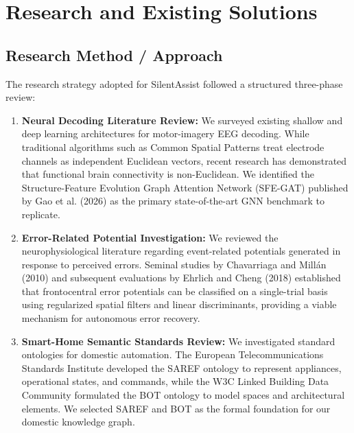 \documentclass[12pt,a4paper]{report}
\begin{document}
\chapter{Research and Existing Solutions}

\section{Research Method / Approach}
The research strategy adopted for SilentAssist followed a structured three-phase review:
\begin{enumerate}[leftmargin=1.5em]
    \item \textbf{Neural Decoding Literature Review:} We surveyed existing shallow and deep learning architectures for motor-imagery EEG decoding. While traditional algorithms such as Common Spatial Patterns treat electrode channels as independent Euclidean vectors, recent research has demonstrated that functional brain connectivity is non-Euclidean. We identified the Structure-Feature Evolution Graph Attention Network (SFE-GAT) published by Gao et al. (2026) \cite{gao2026sfegat} as the primary state-of-the-art GNN benchmark to replicate.
    \item \textbf{Error-Related Potential Investigation:} We reviewed the neurophysiological literature regarding event-related potentials generated in response to perceived errors. Seminal studies by Chavarriaga and Mill\'{a}n (2010) \cite{chavarriaga2010errp} and subsequent evaluations by Ehrlich and Cheng (2018) \cite{ehrlich2018errp} established that frontocentral error potentials can be classified on a single-trial basis using regularized spatial filters and linear discriminants, providing a viable mechanism for autonomous error recovery.
    \item \textbf{Smart-Home Semantic Standards Review:} We investigated standard ontologies for domestic automation. The European Telecommunications Standards Institute developed the SAREF ontology \cite{saref2020} to represent appliances, operational states, and commands, while the W3C Linked Building Data Community formulated the BOT ontology \cite{bot2021} to model spaces and architectural elements. We selected SAREF and BOT as the formal foundation for our domestic knowledge graph.
\end{enumerate}
\end{document}
